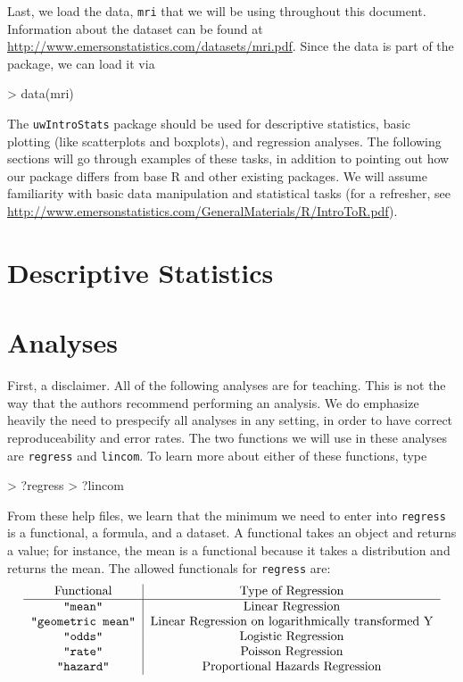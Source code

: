 \documentclass[landscape]{article}
\renewenvironment{Schunk}{\vspace{\topsep}}{\vspace{\topsep}}
\begin{document}
Last, we load the data, \texttt{mri} that we will be using throughout this document. Information about the dataset can be found at \url{http://www.emersonstatistics.com/datasets/mri.pdf}. Since the data is part of the package, we can load it via
\begin{Schunk}
\begin{Sinput}
> data(mri)
\end{Sinput}
\end{Schunk}

The \texttt{uwIntroStats} package should be used for descriptive statistics, basic plotting (like scatterplots and boxplots), and regression analyses. The following sections will go through examples of these tasks, in addition to pointing out how our package differs from base R and other existing packages. We will assume familiarity with basic data manipulation and statistical tasks (for a refresher, see \url{http://www.emersonstatistics.com/GeneralMaterials/R/IntroToR.pdf}).

\section{Descriptive Statistics}
\section{Analyses}
First, a disclaimer. All of the following analyses are for teaching. This is not the way that the authors recommend performing an analysis. We do emphasize heavily the need to prespecify all analyses in any setting, in order to have correct reproduceability and error rates. The two functions we will use in these analyses are \texttt{regress} and \texttt{lincom}. To learn more about either of these functions, type
\begin{Schunk}
\begin{Sinput}
> ?regress
> ?lincom
\end{Sinput}
\end{Schunk}

From these help files, we learn that the minimum we need to enter into \texttt{regress} is a functional, a formula, and a dataset. A functional takes an object and returns a value; for instance, the mean is a functional because it takes a distribution and returns the mean. The allowed functionals for \texttt{regress} are:
\begin{displaymath}
\begin{tabular}{c|c}
Functional & Type of Regression\\
\hline
\texttt{"mean"} & Linear Regression\\
\texttt{"geometric mean"} & Linear Regression on logarithmically transformed Y\\
\texttt{"odds"} & Logistic Regression\\
\texttt{"rate"} & Poisson Regression \\
\texttt{"hazard"} & Proportional Hazards Regression
\end{tabular}
\end{displaymath}
\end{document}
